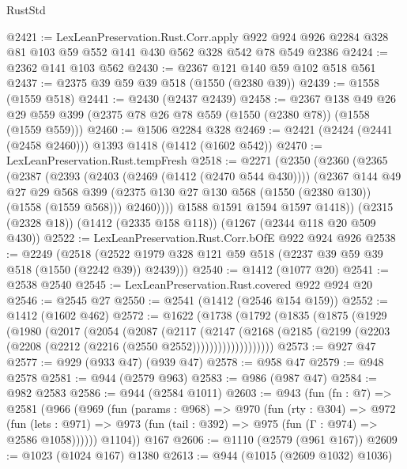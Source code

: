 \begin{lexlean}{RustStd}
\begin{coremodule}
{\begin{coremodule}
{{{{{{{{{{@2421 := LexLeanPreservation.Rust.Corr.apply
    @922
    @924
    @926
    @2284
    @328
    @81
    @103
    @59
    @552
    @141
    @430
    @562
    @328
    @542
    @78
    @549
    @2386
@2424 := @2362 @141 @103 @562
@2430 := @2367 @121 @140 @59 @102 @518 @561
@2437 := @2375 @39 @59 @39 @518 (@1550 (@2380 @39))
@2439 := @1558 (@1559 @518)
@2441 := @2430 (@2437 @2439)
@2458 := @2367
    @138
    @49
    @26
    @29
    @559
    @399
    (@2375 @78 @26 @78 @559 (@1550 (@2380 @78)) (@1558 (@1559 @559)))
@2460 := @1506 @2284 @328
@2469 := @2421 (@2424 (@2441 (@2458 @2460))) @1393 @1418 (@1412 (@1602 @542))
@2470 := LexLeanPreservation.Rust.tempFresh
@2518 := @2271
    (@2350
      (@2360
        (@2365
          (@2387
            (@2393
              (@2403 (@2469 (@1412 (@2470 @544 @430))))
              (@2367
                @144
                @49
                @27
                @29
                @568
                @399
                (@2375 @130 @27 @130 @568 (@1550 (@2380 @130)) (@1558 (@1559 @568)))
                @2460))))
        @1588
        @1591
        @1594
        @1597
        @1418))
    (@2315 (@2328 @18))
    (@1412 (@2335 @158 @118))
    (@1267 (@2344 @118 @20 @509 @430))
@2522 := LexLeanPreservation.Rust.Corr.bOfE @922 @924 @926
@2538 := @2249
    (@2518 (@2522 @1979 @328 @121 @59 @518 (@2237 @39 @59 @39 @518 (@1550 (@2242 @39)) @2439)))
@2540 := @1412 (@1077 @20)
@2541 := @2538 @2540
@2545 := LexLeanPreservation.Rust.covered @922 @924 @20
@2546 := @2545 @27
@2550 := @2541 (@1412 (@2546 @154 @159))
@2552 := @1412 (@1602 @462)
@2572 := @1622
    (@1738
      (@1792
        (@1835
          (@1875
            (@1929
              (@1980
                (@2017
                  (@2054
                    (@2087
                      (@2117
                        (@2147
                          (@2168
                            (@2185
                              (@2199 (@2203 (@2208 (@2212 (@2216 (@2550 @2552)))))))))))))))))))
@2573 := @927 @47
@2577 := @929 (@933 @47) (@939 @47)
@2578 := @958 @47
@2579 := @948 @2578
@2581 := @944 (@2579 @963)
@2583 := @986 (@987 @47)
@2584 := @982 @2583
@2586 := @944 (@2584 @1011)
@2603 := @943
    (fun (fn : @7) =>
    @2581
      (@966
        (@969
          (fun (params : @968) =>
          @970
            (fun (rty : @304) =>
            @972
              (fun (lets : @971) =>
              @973 (fun (tail : @392) => @975 (fun (Γ : @974) => @2586 @1058))))))
        @1104))
    @167
@2606 := @1110 (@2579 (@961 @167))
@2609 := @1023 (@1024 @167) @1380
@2613 := @944 (@1015 (@2609 @1032) @1036)
}}}}}}}}}}
\end{coremodule}}
\end{coremodule}
\end{lexlean}
